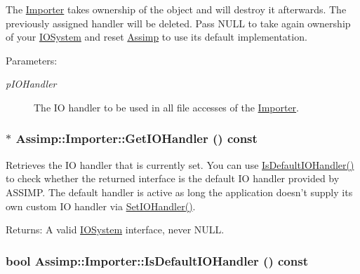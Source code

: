 The \hyperlink{class_assimp_1_1_importer}{Importer} takes ownership of the object and will destroy it afterwards. The previously assigned handler will be deleted. Pass NULL to take again ownership of your \hyperlink{class_assimp_1_1_i_o_system}{IOSystem} and reset \hyperlink{namespace_assimp}{Assimp} to use its default implementation.

\begin{Desc}
\item[Parameters:]
\begin{description}
\item[{\em pIOHandler}]The IO handler to be used in all file accesses of the \hyperlink{class_assimp_1_1_importer}{Importer}. \end{description}
\end{Desc}
\hypertarget{class_assimp_1_1_importer_be3af30f4c5eae2e875b0f32068be44d}{
\subsubsection[GetIOHandler]{$\ast$ Assimp::Importer::GetIOHandler () const}}
\label{class_assimp_1_1_importer_be3af30f4c5eae2e875b0f32068be44d}


Retrieves the IO handler that is currently set. You can use \hyperlink{class_assimp_1_1_importer_e3f26466cf7756594216ffedbc247563}{IsDefaultIOHandler()} to check whether the returned interface is the default IO handler provided by ASSIMP. The default handler is active as long the application doesn't supply its own custom IO handler via \hyperlink{class_assimp_1_1_importer_1161f46318af18bb86dfe0fc3edea4df}{SetIOHandler()}. \begin{Desc}
\item[Returns:]A valid \hyperlink{class_assimp_1_1_i_o_system}{IOSystem} interface, never NULL. \end{Desc}
\hypertarget{class_assimp_1_1_importer_e3f26466cf7756594216ffedbc247563}{
\subsubsection[IsDefaultIOHandler]{\setlength{\rightskip}{0pt plus 5cm}bool Assimp::Importer::IsDefaultIOHandler () const}}
\label{class_assimp_1_1_importer_e3f26466cf7756594216ffedbc247563}



